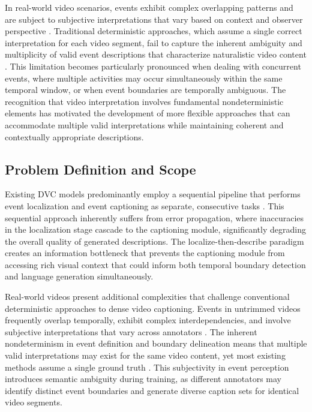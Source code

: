 In real-world video scenarios, events exhibit complex overlapping patterns and are subject to subjective interpretations that vary based on context and observer perspective \cite{long2021temporal}.
Traditional deterministic approaches, which assume a single correct interpretation for each video segment, fail to capture the inherent ambiguity and multiplicity of valid event descriptions that characterize naturalistic video content \cite{Summers2021-mz}.
This limitation becomes particularly pronounced when dealing with concurrent events, where multiple activities may occur simultaneously within the same temporal window, or when event boundaries are temporally ambiguous. 
The recognition that video interpretation involves fundamental nondeterministic elements has motivated the development of more flexible approaches that can accommodate multiple valid interpretations while maintaining coherent and contextually appropriate descriptions.

\subsection{Problem Definition and Scope}

Existing DVC models predominantly employ a sequential pipeline that performs event localization and event captioning as separate, consecutive tasks \cite{Krishna2017-pw, Li2018-ll, Wang2018-ap}.
This sequential approach inherently suffers from error propagation, where inaccuracies in the localization stage cascade to the captioning module, significantly degrading the overall quality of generated descriptions.
The localize-then-describe paradigm creates an information bottleneck that prevents the captioning module from accessing rich visual context that could inform both temporal boundary detection and language generation simultaneously.

Real-world videos present additional complexities that challenge conventional deterministic approaches to dense video captioning.
Events in untrimmed videos frequently overlap temporally, exhibit complex interdependencies, and involve subjective interpretations that vary across annotators \cite{Qasim2025-mp}.
The inherent nondeterminism in event definition and boundary delineation means that multiple valid interpretations may exist for the same video content, yet most existing methods assume a single ground truth \cite{Duan2018-qf, Shen2017-gx}. This subjectivity in event perception introduces semantic ambiguity during training, as different annotators may identify distinct event boundaries and generate diverse caption sets for identical video segments.

